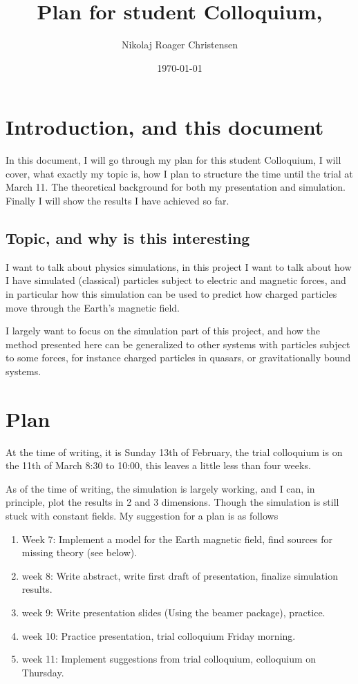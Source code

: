 \documentclass[a4paper,12pt,article]{memoir}
\title{Plan for student Colloquium,}
\author{Nikolaj Roager Christensen}
\date{\today} %
\begin{document}
\maketitle


\tableofcontents*

\chapter{Introduction, and this document}
In this document, I will go through my plan for this student Colloquium, I will cover,  what exactly my topic is, how I plan to structure the time until the trial at March 11. The theoretical background for both my presentation and simulation. Finally I will show the results I have achieved so far.

\section{Topic, and why is this interesting}
I want to talk about physics simulations, in this project I want to talk about how I have simulated (classical) particles subject to electric and magnetic forces, and in particular how this simulation can be used to predict how charged particles move through the Earth's magnetic field.

I largely want to focus on the simulation part of this project, and how the method presented here can be generalized to other systems with particles subject to some forces, for instance charged particles in quasars, or gravitationally bound systems.


\chapter{Plan}
At the time of writing, it is Sunday 13th of February, the trial colloquium is on the 11th of March 8:30 to 10:00, this leaves a little less than four weeks.

As of the time of writing, the simulation is largely working, and I can, in principle, plot the results in 2 and 3 dimensions. Though the simulation is still stuck with constant fields. My suggestion for a plan is as follows

\begin{enumerate}
\item Week 7:  Implement a model for the Earth magnetic field, find sources for missing theory (see below).

\item week 8: Write abstract, write first draft of presentation, finalize simulation results.

\item week 9: Write presentation slides (Using the beamer package), practice.

\item week 10: Practice presentation, trial colloquium Friday morning.

\item week 11: Implement suggestions from trial colloquium, colloquium on Thursday.
\end{enumerate}
\end{document}
